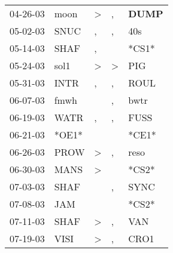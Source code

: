 \begin{supertabular}{p{0.07\textwidth}p{0.06\textwidth}p{0.02\textwidth}p{0.02\textwidth}p{0.06\textwidth}}
          04-26-03\textsuperscript{} &           moon\textsuperscript{} &     \textgreater &                , &  \textbf{DUMP\textsuperscript{}} \\
          05-02-03\textsuperscript{} &           SNUC\textsuperscript{} &                , &                , &            40s\textsuperscript{} \\
          05-14-03\textsuperscript{} &           SHAF\textsuperscript{} &                , &                  &                            *CS1* \\
          05-24-03\textsuperscript{} &           sol1\textsuperscript{} &     \textgreater &     \textgreater &            PIG\textsuperscript{} \\
          05-31-03\textsuperscript{} &           INTR\textsuperscript{} &                , &                , &           ROUL\textsuperscript{} \\
          06-07-03\textsuperscript{} &           fmwh\textsuperscript{} &                  &                , &           bwtr\textsuperscript{} \\
          06-19-03\textsuperscript{} &           WATR\textsuperscript{} &                , &                , &           FUSS\textsuperscript{} \\
          06-21-03\textsuperscript{} &                            *OE1* &                  &                  &                            *CE1* \\
          06-26-03\textsuperscript{} &           PROW\textsuperscript{} &     \textgreater &                , &           reso\textsuperscript{} \\
          06-30-03\textsuperscript{} &           MANS\textsuperscript{} &     \textgreater &                  &                            *CS2* \\
          07-03-03\textsuperscript{} &           SHAF\textsuperscript{} &                  &                , &           SYNC\textsuperscript{} \\
          07-08-03\textsuperscript{} &            JAM\textsuperscript{} &                  &                  &                            *CS2* \\
          07-11-03\textsuperscript{} &           SHAF\textsuperscript{} &     \textgreater &                , &            VAN\textsuperscript{} \\
          07-19-03\textsuperscript{} &           VISI\textsuperscript{} &     \textgreater &                , &           CRO1\textsuperscript{} \\

\end{supertabular}
